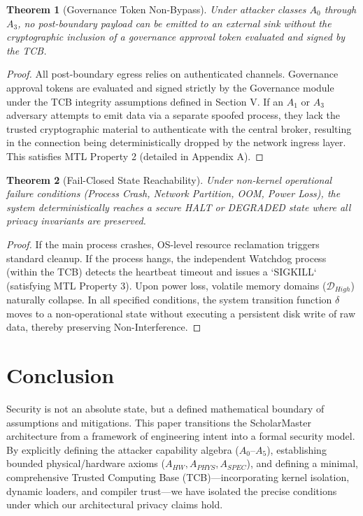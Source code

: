 \documentclass[conference]{IEEEtran}
\newtheorem{theorem}{Theorem}
\begin{document}
\begin{theorem}[Governance Token Non-Bypass]
Under attacker classes $A_0$ through $A_3$, no post-boundary payload can be emitted to an external sink without the cryptographic inclusion of a governance approval token evaluated and signed by the TCB.
\end{theorem}
\begin{proof}
All post-boundary egress relies on authenticated channels. Governance approval tokens are evaluated and signed strictly by the Governance module under the TCB integrity assumptions defined in Section V. If an $A_1$ or $A_3$ adversary attempts to emit data via a separate spoofed process, they lack the trusted cryptographic material to authenticate with the central broker, resulting in the connection being deterministically dropped by the network ingress layer. This satisfies MTL Property 2 (detailed in Appendix A).
\end{proof}

\begin{theorem}[Fail-Closed State Reachability]
Under non-kernel operational failure conditions (Process Crash, Network Partition, OOM, Power Loss), the system deterministically reaches a secure HALT or DEGRADED state where all privacy invariants are preserved.
\end{theorem}
\begin{proof}
If the main process crashes, OS-level resource reclamation triggers standard cleanup. If the process hangs, the independent Watchdog process (within the TCB) detects the heartbeat timeout and issues a `SIGKILL` (satisfying MTL Property 3). Upon power loss, volatile memory domains ($\mathcal{D}_{High}$) naturally collapse. In all specified conditions, the system transition function $\delta$ moves to a non-operational state without executing a persistent disk write of raw data, thereby preserving Non-Interference.
\end{proof}

\section{Conclusion}
Security is not an absolute state, but a defined mathematical boundary of assumptions and mitigations. This paper transitions the ScholarMaster architecture from a framework of engineering intent into a formal security model. By explicitly defining the attacker capability algebra ($A_0$--$A_5$), establishing bounded physical/hardware axioms ($A_{HW}, A_{PHYS}, A_{SPEC}$), and defining a minimal, comprehensive Trusted Computing Base (TCB)—incorporating kernel isolation, dynamic loaders, and compiler trust—we have isolated the precise conditions under which our architectural privacy claims hold. 
\end{document}
